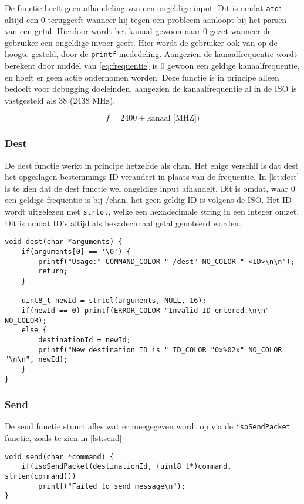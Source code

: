 De functie heeft geen afhandeling van een ongeldige input. Dit is omdat \texttt{atoi} altijd een 0 teruggeeft wanneer hij tegen een probleem aanloopt bij het parsen van een getal. Hierdoor wordt het kanaal gewoon naar 0 gezet wanneer de gebruiker een ongeldige invoer geeft. Hier wordt de gebruiker ook van op de hoogte gesteld, door de \texttt{printf} mededeling. Aangezien de kanaalfrequentie wordt berekent door middel van \autoref{eq:frequentie} is 0 gewoon een geldige kanaalfrequentie, en hoeft er geen actie ondernomen worden. Deze functie is in principe alleen bedoelt voor debugging doeleinden, aangezien de kanaalfrequentie al in de ISO is vastgesteld als 38 (2438 MHz).

\begin{equation} \label{eq:frequentie}
    f = 2400 + \textrm{kanaal [MHZ]})
\end{equation}

\subsubsection{Dest}
De dest functie werkt in principe hetzelfde als chan. Het enige verschil is dat dest het opgeslagen bestemmings-ID verandert in plaats van de frequentie. In \autoref{lst:dest} is te zien dat de dest functie wel ongeldige input afhandelt. Dit is omdat, waar 0 een geldige frequentie is bij /chan, het geen geldig ID is volgens de ISO. Het ID wordt uitgelezen met \texttt{strtol}, welke een hexadecimale string in een integer omzet. Dit is omdat ID's altijd als hexadecimaal getal genoteerd worden.

\begin{lstlisting}[caption={De dest functie},captionpos=b,label={lst:dest},style=c,xleftmargin=.\textwidth,xrightmargin=.\textwidth]
void dest(char *arguments) {
    if(arguments[0] == '\0') {
        printf("Usage:" COMMAND_COLOR " /dest" NO_COLOR " <ID>\n\n");
        return;
    }

    uint8_t newId = strtol(arguments, NULL, 16);
    if(newId == 0) printf(ERROR_COLOR "Invalid ID entered.\n\n" NO_COLOR);
    else {
        destinationId = newId;
        printf("New destination ID is " ID_COLOR "0x%02x" NO_COLOR "\n\n", newId);
    }
}
\end{lstlisting}


\subsubsection{Send}
De send functie stuurt alles wat er meegegeven wordt op via de \texttt{isoSendPacket} functie, zoals te zien in \autoref{lst:send}
\begin{lstlisting}[caption={De send functie},captionpos=b,label={lst:send},style=c,xleftmargin=.\textwidth,xrightmargin=.\textwidth]
void send(char *command) {
    if(isoSendPacket(destinationId, (uint8_t*)command, strlen(command))) 
        printf("Failed to send message\n");    
}
\end{lstlisting}


